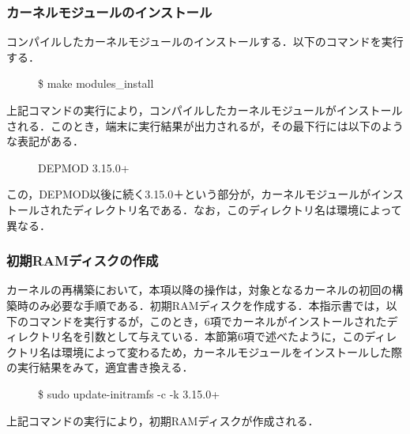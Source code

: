 \documentclass[12pt]{jsarticle}
\begin{document}
\subsubsection{カーネルモジュールのインストール}
コンパイルしたカーネルモジュールのインストールする．以下のコマンドを実行する．
\begin{description}
\item[] \$ make modules\_install
\end{description}
上記コマンドの実行により，コンパイルしたカーネルモジュールがインストールされる．このとき，端末に実行結果が出力されるが，その最下行には以下のような表記がある．
\begin{description}
\item[] DEPMOD 3.15.0+
\end{description}
この，DEPMOD以後に続く3.15.0＋という部分が，カーネルモジュールがインストールされたディレクトリ名である．なお，このディレクトリ名は環境によって異なる．
\subsubsection{初期RAMディスクの作成}
カーネルの再構築において，本項以降の操作は，対象となるカーネルの初回の構築時のみ必要な手順である．初期RAMディスクを作成する．本指示書では，以下のコマンドを実行するが，このとき，6項でカーネルがインストールされたディレクトリ名を引数として与えている．本節第6項で述べたように，このディレクトリ名は環境によって変わるため，カーネルモジュールをインストールした際の実行結果をみて，適宜書き換える．
\begin{description}
\item[] \$ sudo update-initramfs -c -k 3.15.0+
\end{description}
上記コマンドの実行により，初期RAMディスクが作成される．
\end{document}
